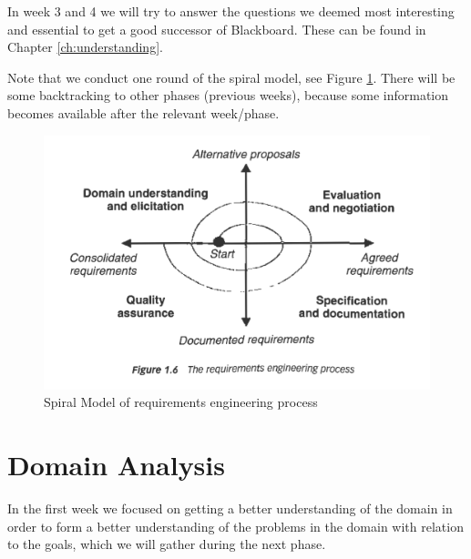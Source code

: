 

In week 3 and 4 we will try to answer the questions we deemed most interesting and essential to get a good successor of Blackboard. These can be found in Chapter \ref{ch:understanding}.

Note that we conduct one round of the spiral model, see Figure \ref{fig:spiral_model}. There will be some backtracking to other phases (previous weeks), because some information becomes available after the relevant week/phase. 

\begin{figure}[h]
	\centering
	\includegraphics[width=0.75\linewidth]{images/re_process}
	\caption{Spiral Model of requirements engineering process}
	\label{fig:spiral_model}
\end{figure}



\chapter{Domain Analysis}
In the first week we focused on getting a better understanding of the domain in order to form a better understanding of the problems in the domain with relation to the goals, which we will gather during the next phase.

